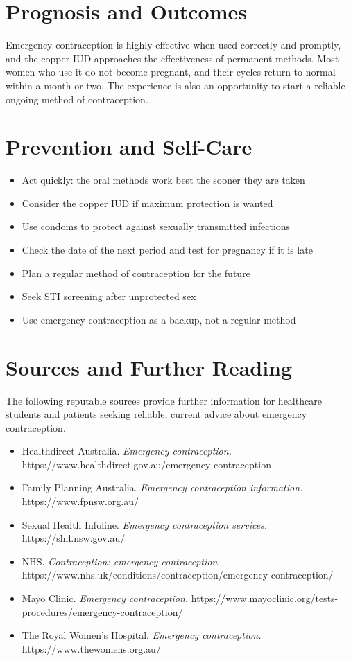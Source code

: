 \section*{Prognosis and Outcomes}
Emergency contraception is highly effective when used correctly and promptly, and the copper IUD approaches the effectiveness of permanent methods. Most women who use it do not become pregnant, and their cycles return to normal within a month or two. The experience is also an opportunity to start a reliable ongoing method of contraception.

\section*{Prevention and Self-Care}
\begin{itemize}
    \item Act quickly: the oral methods work best the sooner they are taken
    \item Consider the copper IUD if maximum protection is wanted
    \item Use condoms to protect against sexually transmitted infections
    \item Check the date of the next period and test for pregnancy if it is late
    \item Plan a regular method of contraception for the future
    \item Seek STI screening after unprotected sex
    \item Use emergency contraception as a backup, not a regular method
\end{itemize}

\section*{Sources and Further Reading}
The following reputable sources provide further information for healthcare students and patients seeking reliable, current advice about emergency contraception.
\begin{itemize}
    \item Healthdirect Australia. \textit{Emergency contraception.} https://www.healthdirect.gov.au/emergency-contraception
    \item Family Planning Australia. \textit{Emergency contraception information.} https://www.fpnsw.org.au/
    \item Sexual Health Infoline. \textit{Emergency contraception services.} https://shil.nsw.gov.au/
    \item NHS. \textit{Contraception: emergency contraception.} https://www.nhs.uk/conditions/contraception/emergency-contraception/
    \item Mayo Clinic. \textit{Emergency contraception.} https://www.mayoclinic.org/tests-procedures/emergency-contraception/
    \item The Royal Women's Hospital. \textit{Emergency contraception.} https://www.thewomens.org.au/
\end{itemize}
